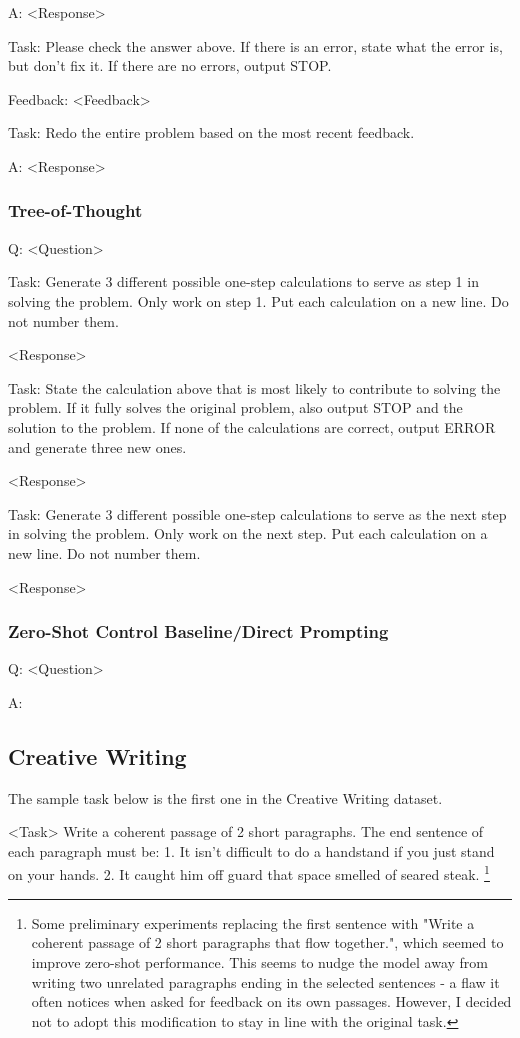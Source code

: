 \documentclass[11pt]{article}
\begin{document}
A: <Response>

Task: Please check the answer above. If there is an error, state what the error is, but don't fix it. If there are no errors, output STOP.

Feedback: <Feedback>

Task: Redo the entire problem based on the most recent feedback.

A: <Response>

\subsubsection*{Tree-of-Thought}

Q: <Question>

Task: Generate 3 different possible one-step calculations to serve as step 1 in solving the problem. Only work on step 1. Put each calculation on a new line. Do not number them.

<Response>

Task: State the calculation above that is most likely to contribute to solving the problem. If it fully solves the original problem, also output STOP and the solution to the problem. If none of the calculations are correct, output ERROR and generate three new ones.

<Response>

Task: Generate 3 different possible one-step calculations to serve as the next step in solving the problem. Only work on the next step. Put each calculation on a new line. Do not number them.

<Response>

\subsubsection*{Zero-Shot Control Baseline/Direct Prompting}

Q: <Question>

A:

\subsection{Creative Writing}

The sample task below is the first one in the Creative Writing dataset. \cite{yao_tree_2023}

<Task> Write a coherent passage of 2 short paragraphs. The end sentence of each paragraph must be: 1. It isn't difficult to do a handstand if you just stand on your hands. 2. It caught him off guard that space smelled of seared steak. \footnote{Some preliminary experiments replacing the first sentence with "Write a coherent passage of 2 short paragraphs that flow together.", which seemed to improve zero-shot performance. This seems to nudge the model away from writing two unrelated paragraphs ending in the selected sentences - a flaw it often notices when asked for feedback on its own passages. However, I decided not to adopt this modification to stay in line with the original task.}
\end{document}
